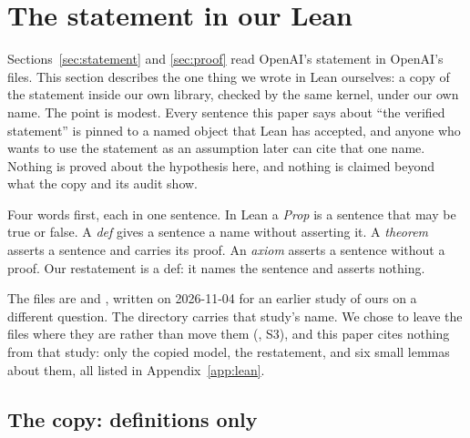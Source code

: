 \section{The statement in our Lean}
\label{sec:lean}
\begingroup\sloppy

Sections~\ref{sec:statement} and \ref{sec:proof} read OpenAI's statement
in OpenAI's files. This section describes the one thing we wrote in Lean
ourselves: a copy of the statement inside our own library, checked by
the same kernel, under our own name. The point is modest. Every sentence
this paper says about ``the verified statement'' is pinned to a named
object that Lean has accepted, and anyone who wants to use the statement
as an assumption later can cite that one name. Nothing is proved about
the hypothesis here, and nothing is claimed beyond what the copy and its
audit show.

Four words first, each in one sentence. In Lean a \emph{Prop} is a
sentence that may be true or false. A \emph{def} gives a sentence a name
without asserting it. A \emph{theorem} asserts a sentence and carries its
proof. An \emph{axiom} asserts a sentence without a proof. Our
restatement is a def: it names the sentence and asserts nothing.

The files are 
and , written
on 2026-11-04 for an earlier study of ours on a different question. The
directory carries that study's name. We chose to leave the files
where they are rather than move them (,
S3), and this paper cites nothing from that study: only the copied
model, the restatement, and six small lemmas about them, all listed in
Appendix~\ref{app:lean}.

\subsection{The copy: definitions only}
\label{sec:lean-copy}


